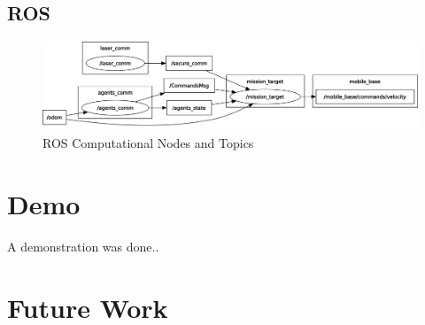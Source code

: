 \documentclass[botnum, fleqn]{unmeethesis}
\begin{document}
\subsection*{ROS} \label{sec:ros}

\begin{figure}[ht]
 \begin{center}
  \includegraphics[width=0.8 \textwidth]{figures/rosgraph_full.png}
  \caption{\small \label{fig:rosgraph} ROS Computational Nodes and Topics}
 \end{center}
\end{figure}

\section*{Demo} \label{sec:Demo}

A demonstration was done.. \cite{video_demo}


\section*{Future Work} \label{sec:Future Work}




\end{document}
